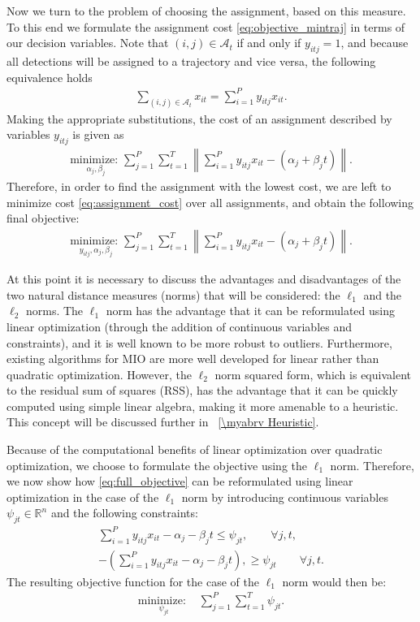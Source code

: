 Now we turn to the problem of choosing the assignment, based on this measure. To this end we formulate the assignment cost \eqref{eq:objective_mintraj} in terms of our decision variables. Note that $(i,j)\in\mathcal{A}_t$ if and only if $y_{itj}=1$, and because all detections will be assigned to a trajectory and vice versa, the following equivalence holds
\begin{align*}
\sum_{(i,j)\in \mathcal{A}_{t}} x_{it} = \sum_{i=1}^{P}y_{itj}x_{it}.
\end{align*}
Making the appropriate substitutions, the cost of an assignment described by variables $y_{itj}$ is given as
\begin{align}\label{eq:assignment_cost}
 \underset{\alpha_{j}, \beta_{j}}{\text{minimize: }} \sum_{j=1}^{P} \sum_{t=1}^{T}  \left \| \sum_{i=1}^{P}y_{itj}x_{it} - (\alpha_{j} + \beta_{j}t)\right \|.
\end{align}
Therefore, in order to find the assignment with the lowest cost, we are left to minimize cost \eqref{eq:assignment_cost} over all assignments, and obtain the following final objective: 
\begin{align}\label{eq:full_objective}
 \underset{y_{itj}, \alpha_{j}, \beta_{j}}{\text{minimize: }}\sum_{j=1}^{P} \sum_{t=1}^{T}  \left \| \sum_{i=1}^{P}y_{itj}x_{it} - (\alpha_{j} + \beta_{j}t) \right \|.
\end{align}

At this point it is necessary to discuss the advantages and disadvantages of the two natural distance measures (norms) that will be considered: the $\ell_1$ and the $\ell_2$ norms. The $\ell_1$ norm has the advantage that it can be reformulated using linear optimization (through the addition of continuous variables and constraints), and it is well known to be more robust to outliers. Furthermore, existing algorithms for MIO are more well developed for linear rather than quadratic optimization. However, the $\ell_2$ norm squared form, which is equivalent to the residual sum of squares (RSS), has the advantage that it can be quickly computed using simple linear algebra, making it more amenable to a heuristic. This concept will be discussed further in \mysection~\ref{\myabrv Heuristic}.

Because of the computational benefits of linear optimization over quadratic optimization, we choose to formulate the objective using the $\ell_1$ norm. Therefore, we now show how \eqref{eq:full_objective} can be reformulated using linear optimization in the case of the $\ell_1$ norm by introducing continuous variables $\psi_{jt} \in \mathbb{R}^n$ and the following constraints:
\begin{align*}
\sum_{i=1}^{P}y_{itj}x_{it} - \alpha_{j} - \beta_{j}t \leq \psi_{jt}, \qquad \forall j,t,\\
-\left(\sum_{i=1}^{P}y_{itj}x_{it} - \alpha_{j} - \beta_{j}t\right), \geq \psi_{jt} \qquad \forall j,t.
\end{align*}
The resulting objective function for the case of the $\ell_1$ norm would then be:
\begin{align*}
\underset{\psi_{jt}}{\text{minimize: }} & \sum_{j=1}^{P} \sum_{t=1}^{T} \psi_{jt}.
\end{align*}

